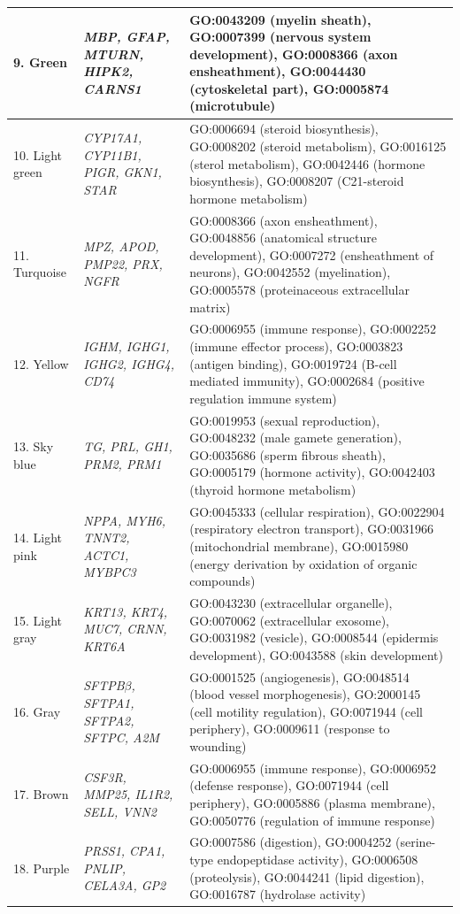 \documentclass[10pt,letterpaper]{article}
\begin{document}
\begin{table}[!hp]
\begin{adjustwidth}{-2in}{0in}
\begin{tabular}{|p{1.0in}|p{1.5in}|p{4.3in}|}
9. Green & \textit{MBP, GFAP, MTURN, HIPK2, CARNS1} & GO:0043209 (myelin sheath), GO:0007399 (nervous system development), GO:0008366 (axon ensheathment), GO:0044430 (cytoskeletal part), GO:0005874 (microtubule) \\ \hline
10. Light green & \textit{CYP17A1, CYP11B1, PIGR, GKN1, STAR} & GO:0006694 (steroid biosynthesis), GO:0008202 (steroid metabolism), GO:0016125 (sterol metabolism), GO:0042446 (hormone biosynthesis), GO:0008207 (C21-steroid hormone metabolism) \\ \hline
11. Turquoise & \textit{MPZ, APOD, PMP22, PRX, NGFR} & GO:0008366 (axon ensheathment), GO:0048856 (anatomical structure development), GO:0007272 (ensheathment of neurons), GO:0042552 (myelination), GO:0005578 (proteinaceous extracellular matrix) \\ \hline
12. Yellow & \textit{IGHM, IGHG1, IGHG2, IGHG4, CD74} & GO:0006955 (immune response), GO:0002252 (immune effector process), GO:0003823 (antigen binding), GO:0019724 (B-cell mediated immunity), GO:0002684 (positive regulation immune system) \\ \hline
13. Sky blue & \textit{TG, PRL, GH1, PRM2, PRM1} & GO:0019953 (sexual reproduction), GO:0048232 (male gamete generation), GO:0035686 (sperm fibrous sheath), GO:0005179 (hormone activity), GO:0042403 (thyroid hormone metabolism) \\ \hline
14. Light pink & \textit{NPPA, MYH6, TNNT2, ACTC1, MYBPC3} & GO:0045333 (cellular respiration), GO:0022904 (respiratory electron transport), GO:0031966 (mitochondrial membrane), GO:0015980 (energy derivation by oxidation of organic compounds) \\ \hline
15. Light gray & \textit{KRT13, KRT4, MUC7, CRNN, KRT6A} & GO:0043230 (extracellular organelle), GO:0070062 (extracellular exosome), GO:0031982 (vesicle), GO:0008544 (epidermis development), GO:0043588 (skin development) \\ \hline
16. Gray & \textit{SFTPB$\beta$, SFTPA1, SFTPA2, SFTPC, A2M} & GO:0001525 (angiogenesis), GO:0048514 (blood vessel morphogenesis), GO:2000145 (cell motility regulation), GO:0071944 (cell periphery), GO:0009611 (response to wounding) \\ \hline
17. Brown & \textit{CSF3R, MMP25, IL1R2, SELL, VNN2} & GO:0006955 (immune response), GO:0006952 (defense response), GO:0071944 (cell periphery), GO:0005886 (plasma membrane), GO:0050776 (regulation of immune response) \\ \hline
18. Purple & \textit{PRSS1, CPA1, PNLIP, CELA3A, GP2} & GO:0007586 (digestion), GO:0004252 (serine-type endopeptidase activity), GO:0006508 (proteolysis), GO:0044241 (lipid digestion), GO:0016787 (hydrolase activity) \\ \hline

\end{tabular}
\end{adjustwidth}
\end{table}
\end{document}
